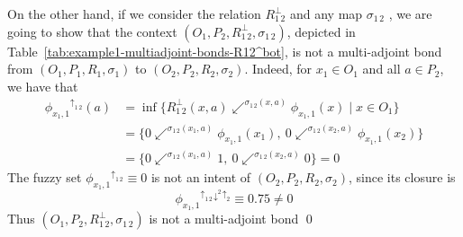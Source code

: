 \documentclass[runningheads,a4paper]{llncs}
\newcommand{\up}[1][]{{^{\uparrow_{#1}}}}
\newcommand{\down}[1][]{{^{\downarrow^{#1}}}}
\newcommand{\adjoint}{\mathop{\&}\nolimits}
\newcommand{\G}{\text{G}}
\let\oldLcommand\L
\let\L\relax
\def\L{\text{\oldLcommand}}
\begin{document}
\begin{example}

On the other hand, if we consider the relation $R_{1\,2}^\bot$ and any map $\sigma_{1\,2}$%
, we are going to show that the context $(O_1, P_2, R_{1\,2}^\bot, \sigma_{1\,2})$, depicted in Table~\ref{tab:example1-multiadjoint-bonds-R12^bot}, is not a multi-adjoint bond from $(O_1, P_1, R_1, \sigma_1)$ to $(O_2, P_2, R_2, \sigma_2)$. Indeed, for $x_1 \in O_1$ and all $a \in P_2$, we have that
\begin{align*}
    \phi_{x_1, 1}\up[1\,2](a) &= \inf \{R_{1\,2}^\bot(x, a) \swarrow^{\sigma_{1\,2}(x, a)} \phi_{x_1, 1}(x) \mid x \in O_1 \} \\
    &= \{0 \swarrow^{\sigma_{1\,2}(x_1, a)} \phi_{x_1, 1}(x_1), \ 0 \swarrow^{\sigma_{1\,2}(x_2, a)} \phi_{x_1, 1}(x_2)\} \\
    &= \{0 \swarrow^{\sigma_{1\,2}(x_1, a)} 1, \ 0 \swarrow^{\sigma_{1\,2}(x_2, a)} 0\} = 0
\end{align*}
The fuzzy set $\phi_{x_1, 1}\up[1\,2] \equiv 0$ is not an intent of $(O_2, P_2, R_2, \sigma_2)$, since its closure is
 $$\phi_{x_1, 1}\up[1\,2]\down[2]\up[2] \equiv 0.75 \neq 0$$
Thus $(O_1, P_2, R_{1\,2}^\bot, \sigma_{1\,2})$ is not a multi-adjoint bond %
\qed




\end{example}
\end{document}
